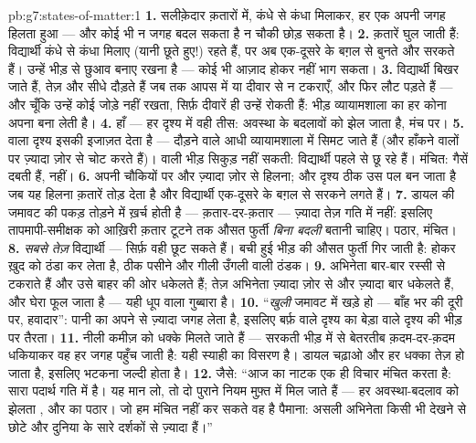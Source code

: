 \begin{solution}{pb:g7:states-of-matter:1}
\textbf{1.} सलीक़ेदार क़तारों में, कंधे से कंधा मिलाकर, हर एक अपनी जगह
हिलता हुआ --- और कोई भी न जगह बदल सकता है न चौकी छोड़ सकता है।
\textbf{2.} क़तारें घुल जाती हैं: विद्यार्थी कंधे से कंधा मिलाए
(यानी छूते हुए!) रहते हैं, पर अब एक-दूसरे के बग़ल से बुनते और सरकते
हैं। उन्हें भीड़ से छुआव बनाए रखना है --- कोई भी आज़ाद होकर नहीं भाग
सकता।
\textbf{3.} विद्यार्थी बिखर जाते हैं, तेज़ और सीधे दौड़ते हैं जब तक
आपस में या दीवार से न टकराएँ, और फिर लौट पड़ते हैं --- और चूँकि
उन्हें कोई जोड़े नहीं रखता, सिर्फ़ दीवारें ही उन्हें रोकती हैं: भीड़
व्यायामशाला का हर कोना अपना बना लेती है।
\textbf{4.} हाँ --- हर दृश्य में वही तीस:  अवस्था के बदलावों
को झेल जाता है, मंच पर।
\textbf{5.}  वाला दृश्य इसकी इजाज़त देता है --- दौड़ने वाले आधी
व्यायामशाला में सिमट जाते हैं (और हाँकने वालों पर ज़्यादा ज़ोर से चोट
करते हैं)।  वाली भीड़ सिकुड़ नहीं सकती: विद्यार्थी पहले से छू रहे
हैं। मंचित: गैसें दबती हैं,  नहीं।
\textbf{6.} अपनी चौकियों पर और ज़्यादा ज़ोर से हिलना; और दृश्य ठीक उस
पल  बन जाता है जब यह हिलना क़तारें तोड़ देता है और विद्यार्थी
एक-दूसरे के बग़ल से सरकने लगते हैं।
\textbf{7.} डायल की  जमावट की पकड़ तोड़ने में ख़र्च होती है ---
क़तार-दर-क़तार --- ज़्यादा तेज़ गति में नहीं: इसलिए तापमापी-समीक्षक को
आख़िरी क़तार टूटने तक औसत फुर्ती \emph{बिना बदली} बतानी चाहिए। पठार,
मंचित।
\textbf{8.} \emph{सबसे तेज़} विद्यार्थी --- सिर्फ़ वही छूट सकते हैं।
बची हुई भीड़ की औसत फुर्ती गिर जाती है:   होकर ख़ुद को ठंडा
कर लेता है, ठीक पसीने और गीली उँगली वाली ठंडक।
\textbf{9.} अभिनेता बार-बार रस्सी से टकराते हैं और उसे बाहर की ओर
धकेलते हैं; तेज़ अभिनेता ज़्यादा ज़ोर से और ज़्यादा बार धकेलते हैं,
और घेरा फूल जाता है --- यही धूप वाला गुब्बारा है।
\textbf{10.} ``\emph{खुली} जमावट में खड़े हो --- बाँह भर की दूरी पर,
हवादार'': पानी का  अपने  से ज़्यादा जगह लेता है, इसलिए बर्फ़
वाले दृश्य का बेड़ा  वाले दृश्य की भीड़ पर तैरता।
\textbf{11.} नीली कमीज़ को धक्के मिलते जाते हैं --- सरकती भीड़ में
से बेतरतीब क़दम-दर-क़दम धकियाकर वह हर जगह पहुँच जाती है: यही स्याही
का विसरण है। डायल चढ़ाओ और हर धक्का तेज़ हो जाता है, इसलिए भटकना जल्दी
होता है।
\textbf{12.} जैसे: ``आज का नाटक एक ही विचार मंचित करता है: सारा पदार्थ
गति में  है। यह मान लो, तो दो पुराने नियम मुफ़्त में मिल जाते हैं
--- हर अवस्था-बदलाव को झेलता , और  का पठार। जो हम मंचित
नहीं कर सकते वह है पैमाना: असली अभिनेता किसी भी देखने से छोटे और
दुनिया के सारे दर्शकों से ज़्यादा हैं।''
\end{solution}
